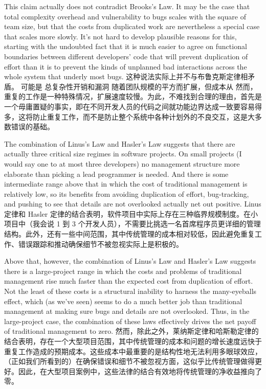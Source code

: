 \documentclass[a4paper,12pt,UTF8,twoside]{ctexbook}
\begin{document}
This claim actually does not contradict Brooks's Law. It may be the case that total complexity overhead and vulnerability to bugs scales with the square of team size, but that the costs from duplicated work are nevertheless a special case that scales more slowly. It's not hard to develop plausible reasons for this, starting with the undoubted fact that it is much easier to agree on functional boundaries between different developers' code that will prevent duplication of effort than it is to prevent the kinds of unplanned bad interactions across the whole system that underly most bugs.
这种说法实际上并不与布鲁克斯定律相矛盾。 可能是 总复杂性开销和漏洞 随着团队规模的平方而扩展，但成本从 然而，重复的工作是一种特殊情况，扩展速度较慢。为此，不难找到合理的理由，首先是一个毋庸置疑的事实，即在不同开发人员的代码之间就功能边界达成一致要容易得多，这将防止重复工作，而不是防止整个系统中各种计划外的不良交互，这是大多数错误的基础。

The combination of Linus's Law and Hasler's Law suggests that there are actually three critical size regimes in software projects. On small projects (I would say one to at most three developers) no management structure more elaborate than picking a lead programmer is needed. And there is some intermediate range above that in which the cost of traditional management is relatively low, so its benefits from avoiding duplication of effort, bug-tracking, and pushing to see that details are not overlooked actually net out positive.
Linus 定律和 Hasler 定律的结合表明，软件项目中实际上存在三种临界规模制度。在小项目中（我会说 1 到 3 个开发人员），不需要比挑选一名首席程序员更详细的管理结构。此外，还有一些中间范围，其中传统管理的成本相对较低，因此避免重复工作、错误跟踪和推动确保细节不被忽视实际上是积极的。

Above that, however, the combination of Linus's Law and Hasler's Law suggests there is a large-project range in which the costs and problems of traditional management rise much faster than the expected cost from duplication of effort. Not the least of these costs is a structural inability to harness the many-eyeballs effect, which (as we've seen) seems to do a much better job than traditional management at making sure bugs and details are not overlooked. Thus, in the large-project case, the combination of these laws effectively drives the net payoff of traditional management to zero.
然而，除此之外，莱纳斯定律和哈斯勒定律的结合表明，存在一个大型项目范围，其中传统管理的成本和问题的增长速度远快于重复工作造成的预期成本。这些成本中最重要的是结构性地无法利用多眼球效应，（正如我们所看到的）在确保错误和细节不被忽视方面，这似乎比传统管理做得更好。因此，在大型项目案例中，这些法律的结合有效地将传统管理的净收益推向了零。
\end{document}
